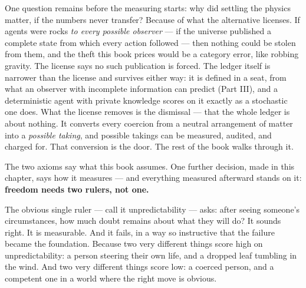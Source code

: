 One question remains before the measuring starts: why did settling the
physics matter, if the numbers never transfer? Because of what the
alternative licenses. If agents were rocks \emph{to every possible observer}
--- if the universe published a complete state from which every action
followed --- then nothing could be stolen from them, and the theft this
book prices would be a category error, like robbing gravity. The
license says no such publication is forced. The ledger itself is
narrower than the license and survives either way: it is defined in a
seat, from what an observer with incomplete information can predict
(Part III), and a deterministic agent with private knowledge scores on
it exactly as a stochastic one does. What the license removes is the
dismissal --- that the whole ledger is about nothing. It converts every
coercion from a neutral arrangement of matter into a \emph{possible taking},
and possible takings can be measured, audited, and charged for. That conversion is the door. The
rest of the book walks through it.

\renewcommand{\partlist}{\partline{4}{The Leaf and the Timetable}{ch4}\partline{5}{The Gate}{ch5}\partline{6}{The Frontier, and the Plateau}{ch6}\partline{7}{Cheap Theft}{ch7}}\renewcommand{\runninghead}{One Agent: The Anatomy of Freedom}




The two axioms say what this book assumes. One further decision, made in
this chapter, says how it measures --- and everything measured afterward
stands on it: \textbf{freedom needs two rulers, not one.}

The obvious single ruler --- call it unpredictability --- asks: after seeing
someone's circumstances, how much doubt remains about what they will do?
It sounds right. It is measurable. And it fails, in a way so instructive
that the failure became the foundation. Because two very different
things score high on unpredictability: a person steering their own life,
and a dropped leaf tumbling in the wind. And two very different things
score low: a coerced person, and a competent one in a world where the
right move is obvious.

